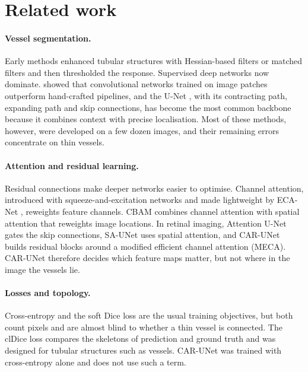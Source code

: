 \documentclass[a4paper,fleqn]{cas-sc}
\begin{document}
\section{Related work}
\label{sec:related}

\paragraph{Vessel segmentation.} Early methods enhanced tubular structures with Hessian-based filters \citep{frangi1998} or matched filters and then thresholded the response. Supervised deep networks now dominate. \citet{liskowski2016} showed that convolutional networks trained on image patches outperform hand-crafted pipelines, and the U-Net \citep{ronneberger2015unet}, with its contracting path, expanding path and skip connections, has become the most common backbone because it combines context with precise localisation. Most of these methods, however, were developed on a few dozen images, and their remaining errors concentrate on thin vessels.

\paragraph{Attention and residual learning.} Residual connections \citep{he2016resnet} make deeper networks easier to optimise. Channel attention, introduced with squeeze-and-excitation networks \citep{hu2018se} and made lightweight by ECA-Net \citep{wang2020eca}, reweights feature channels. CBAM \citep{woo2018cbam} combines channel attention with spatial attention that reweights image locations. In retinal imaging, Attention U-Net \citep{oktay2018attention} gates the skip connections, SA-UNet \citep{guo2021saunet} uses spatial attention, and CAR-UNet \citep{guo2021carunet} builds residual blocks around a modified efficient channel attention (MECA). CAR-UNet therefore decides which feature maps matter, but not where in the image the vessels lie.

\paragraph{Losses and topology.} Cross-entropy and the soft Dice loss \citep{milletari2016vnet} are the usual training objectives, but both count pixels and are almost blind to whether a thin vessel is connected. The clDice loss \citep{shit2021cldice} compares the skeletons of prediction and ground truth and was designed for tubular structures such as vessels. CAR-UNet was trained with cross-entropy alone and does not use such a term.
\end{document}
